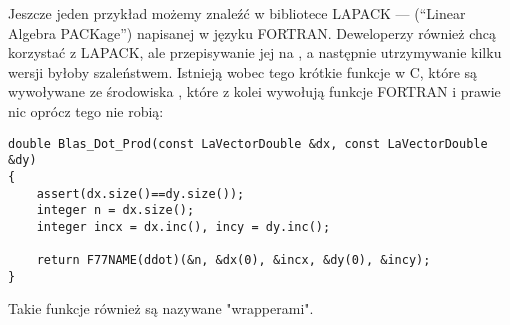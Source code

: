 Jeszcze jeden przykład możemy znaleźć w bibliotece LAPACK --- (``Linear Algebra PACKage'') napisanej w języku FORTRAN.
Deweloperzy \CCpp również chcą korzystać z LAPACK, ale przepisywanie jej na \CCpp, a następnie utrzymywanie kilku wersji byłoby szaleństwem.
Istnieją wobec tego krótkie funkcje w C, które są wywoływane ze środowiska \CCpp{}, które z kolei wywołują funkcje FORTRAN i prawie nic oprócz tego nie robią:

\begin{lstlisting}[style=customc]
double Blas_Dot_Prod(const LaVectorDouble &dx, const LaVectorDouble &dy)
{
    assert(dx.size()==dy.size());
    integer n = dx.size();
    integer incx = dx.inc(), incy = dy.inc();

    return F77NAME(ddot)(&n, &dx(0), &incx, &dy(0), &incy);
}
\end{lstlisting}

Takie funkcje również są nazywane "wrapperami".



